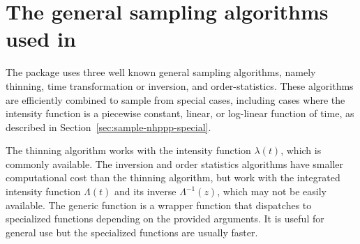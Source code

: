 \documentclass[article,nojss]{jss}\usepackage[]{graphicx}\usepackage[]{xcolor}
\newcommand{\fct}[1]{\code{#1()}}
\begin{document}
\section[The general sampling algorithms used in nhppp]{The general sampling algorithms used in }\label{sec:general-sampling}

The  package uses three well known general sampling algorithms, namely thinning, time transformation or inversion, and order-statistics. These algorithms are efficiently combined to sample from special cases, including cases where the intensity function is a piecewise constant, linear, or log-linear function of time, as described in Section~\ref{sec:sample-nhppp-special}.

The thinning algorithm works with the intensity function $\lambda(t)$, which is commonly available. The inversion and order statistics algorithms have smaller computational cost than the thinning algorithm, but work with the integrated intensity function $\Lambda(t)$ and its inverse $\Lambda^{-1}(z)$, which may not be easily available. The generic function \fct{draw} is a wrapper function that dispatches to specialized functions depending on the provided arguments. It is useful for general use but the specialized functions are usually faster.
\end{document}
